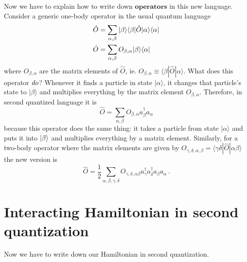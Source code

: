 \documentclass{article}
\begin{document}
Now we have to explain how to write down $\textbf{operators}$ in this new language.
Consider a generic one-body operator in the usual quantum language
\begin{align}
\hat{O} & = \sum_{\alpha,\beta}| \beta \rangle\langle \beta |\hat{O}| \alpha \rangle\langle \alpha | \\
\hat{O} & = \sum_{\alpha,\beta}O_{\beta,\alpha}| \beta \rangle\langle \alpha |
\end{align}
where $O_{\beta,\alpha}$ are the matrix elements of $\hat{O}$, ie. $O_{\beta,\alpha}\equiv\langle\beta|\hat{O}|\alpha\rangle$.
What does this operator $\emph{do}$?
Whenever it finds a particle in state $|\alpha\rangle$, it changes that particle's state to $|\beta\rangle$
and multiplies everything by the matrix element $O_{\beta,\alpha}$.
Therefore, in second quantized language it is
\begin{equation}
\hat{O}=\sum_{\alpha,\beta}O_{\beta,\alpha}a_{\beta}^{\dagger}a_{\alpha}
\end{equation}
because this operator does the same thing: it takes a particle from state $|\alpha\rangle$ and puts it into $| \beta \rangle$ and multiplies everything by a matrix element.
Similarly, for a two-body operator where the matrix elements are given by $O_{\gamma,\delta,\alpha,\beta}=\langle\gamma\delta|\hat{O}|\alpha\beta\rangle$
the new version is
\begin{equation}
\hat{O} = \frac{1}{2} \sum_{\alpha,\beta,\gamma,\delta} O_{\gamma,\delta,\alpha \beta} a_{\gamma}^{\dagger} a_{\delta}^{\dagger} a_{\beta}a_{\alpha} \, .
\end{equation}


\section{Interacting Hamiltonian in second quantization}

Now we have to write down our Hamiltonian in second quantization.
\end{document}
